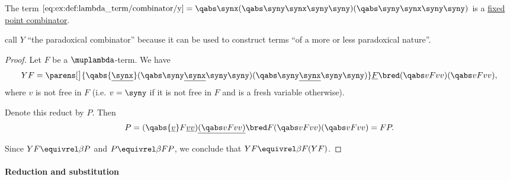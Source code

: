 \begin{proposition}\label{thm:y_is_a_fixed_point_combinator}
  The term \( \ref{eq:ex:def:lambda_term/combinator/y} = \qabs \synx (\qabs \syny \synx \syny \syny) (\qabs \syny \synx \syny \syny) \) is a \hyperref[def:function_fixed_point_combinator]{fixed point combinator}.
\end{proposition}
\begin{comments}
  \item \Textcite*[177]{CurryFeysCraig1958CombinatoryLogicVol1} call \( Y \) \enquote{the paradoxical combinator} because it can be used to construct terms \enquote{of a more or less paradoxical nature}.
\end{comments}
\begin{proof}
  Let \( F \) be a \( \muplambda \)-term. We have
  \begin{equation*}
    YF
    =
    \parens[\big]{ \qabs {\underline{\synx}} (\qabs \syny \underline{\synx} \syny \syny) (\qabs \syny \underline{\synx} \syny \syny) } \underline{F}
    \bred
    (\qabs v F v v) (\qabs v F v v),
  \end{equation*}
  where \( v \) is not free in \( F \) (i.e. \( v = \syny \) if it is not free in \( F \) and is a fresh variable otherwise).

  Denote this reduct by \( P \). Then
  \begin{equation*}
    P =
    (\qabs {\underline{v}} F \underline{v} \underline{v}) \underline{(\qabs v F v v)}
    \bred
    F (\qabs v F v v) (\qabs v F v v)
    =
    FP.
  \end{equation*}

  Since \( YF \equivrel\beta P \) and \( P \equivrel\beta FP \), we conclude that \( YF \equivrel\beta F(YF) \).
\end{proof}

\paragraph{Reduction and substitution}

